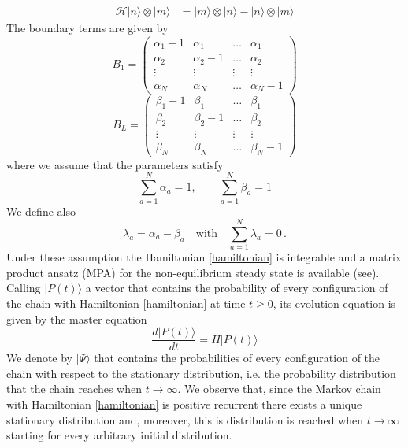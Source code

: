 \documentclass[11pt]{article}
\numberwithin{equation}{section}
\numberwithin{equation}{subsection}
\begin{document}
\begin{equation}
	\begin{split}
		\mathcal{H}|n\rangle\otimes   |m\rangle&=|m\rangle \otimes |n\rangle-|n\rangle \otimes|m\rangle
	\end{split}
\end{equation}
The boundary terms are given by 
\begin{equation}
	B_{1}=\begin{pmatrix}
		\alpha_{1}-1&\alpha_{1}&\ldots&\alpha_{1}\\
		\alpha_{2}&\alpha_{2}-1&\ldots&\alpha_{2}\\
		\vdots&\vdots&\vdots&\vdots\\
		\alpha_{N}&\alpha_{N}&\ldots&\alpha_{N}-1
	\end{pmatrix}
\end{equation}
\begin{equation}
	B_{L}=\begin{pmatrix}
		\beta_{1}-1&\beta_{1}&\ldots&\beta_{1}\\
		\beta_{2}&\beta_{2}-1&\ldots&\beta_{2}\\
		\vdots&\vdots&\vdots&\vdots\\
		\beta_{N}&\beta_{N}&\ldots&\beta_{N}-1
	\end{pmatrix}
\end{equation}
where we assume that the parameters satisfy
\begin{equation}\label{ratesConditions}
	\sum_{a=1}^{N}\alpha_{a}=1,\qquad\sum_{a=1}^{N}\beta_{a}=1
\end{equation} 
We define also 
\begin{equation}\label{lambdaConditions}
	\lambda_{a}=\alpha_{a}-\beta_{a}\quad\text{with}\quad \sum_{a=1}^{N}\lambda_{a}=0\,.
\end{equation}
Under these assumption the Hamiltonian \eqref{hamiltonian} is integrable and a matrix product ansatz (MPA) for the non-equilibrium steady state is available (see\cite{vanicat2017exact}). 
 Calling $|{P}(t)\rangle$ a vector that contains the probability of every configuration of the chain with Hamiltonian \eqref{hamiltonian} at time $t\geq 0$, its evolution equation is given by 
 the master equation
\begin{equation}
    \frac{d|{P}(t)\rangle}{dt}=H|{P}(t)\rangle
\end{equation}
We denote by $|\Psi\rangle$ that contains the probabilities of every configuration of the chain with respect to the stationary distribution, i.e. the probability distribution that the chain reaches when $t\to \infty$. We observe that, since the Markov chain with Hamiltonian \eqref{hamiltonian} is positive recurrent there exists a unique stationary distribution and, moreover, this is distribution is reached when $t\to \infty$ starting for every arbitrary initial distribution. 
\end{document}
